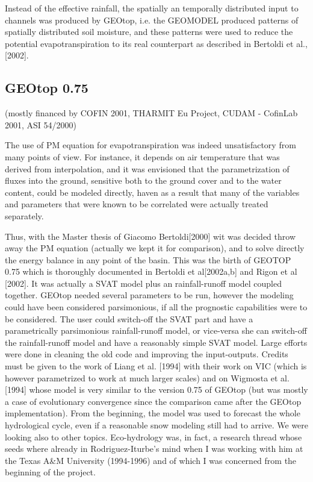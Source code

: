 Instead of the effective rainfall, the spatially an temporally distributed input to channels was produced by GEOtop, i.e. the GEOMODEL produced patterns of spatially distributed soil moisture, and these patterns were used to reduce the potential evapotranspiration to its real counterpart as described in Bertoldi et al., [2002]. 

\subsection{GEOtop 0.75}
(mostly financed by COFIN 2001, THARMIT Eu Project, CUDAM - CofinLab 2001, ASI 54/2000)

The use of PM  equation for evapotranspiration was indeed unsatisfactory from many points of view. For instance, it depends on air temperature that was derived from interpolation, and it was envisioned that  the parametrization of fluxes into the ground, sensitive both to the ground cover and to the water content, could be modeled directly, haven as a  result that many of the variables and parameters that were known to be correlated were actually treated separately.
 
Thus, with the Master thesis of Giacomo Bertoldi[2000] wit was decided throw away the PM equation (actually we kept it for comparison), and to solve directly the energy balance in any point of the basin. This was the birth of GEOTOP 0.75 which is thoroughly documented in Bertoldi et al[2002a,b] and Rigon et al [2002]. It was actually a SVAT model plus an rainfall-runoff model coupled together. GEOtop needed several parameters to be run, however the modeling could have been considered parsimonious, if all the prognostic capabilities were to be considered.   The user could switch-off the SVAT part and have a parametrically parsimonious rainfall-runoff model, or vice-versa she can switch-off the rainfall-runoff model and have a reasonably simple SVAT model. 
Large efforts were  done in cleaning the old code and improving the input-outputs. Credits must be given to the work of Liang et al. [1994] with their work on VIC (which is however parametrized to work at much larger scales) and on Wigmosta et al. [1994] whose model is very similar to the version 0.75 of GEOtop (but was mostly a case of evolutionary convergence since the comparison came after the GEOtop implementation). 
From the beginning,  the model was used  to forecast the whole hydrological cycle, even if a reasonable snow modeling still had to arrive. We were looking also to other topics. 
 Eco-hydrology was, in fact, a research thread whose seeds where already in Rodriguez-Iturbe's mind when I was working with him at the Texas A\&M University (1994-1996) and of which I was concerned from the beginning of the project. 

